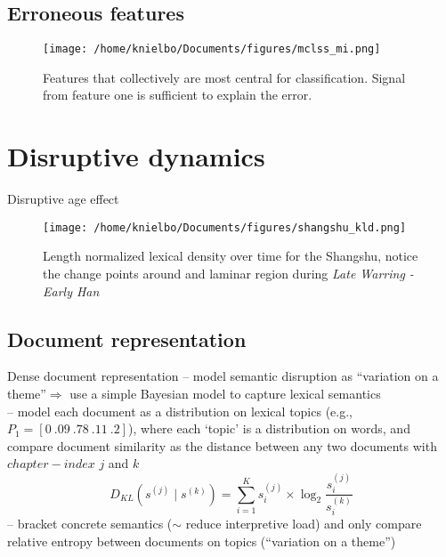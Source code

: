 \subsection{Erroneous features}
\begin{frame}
\begin{figure}
	\centering
	\texttt{[image: /home/knielbo/Documents/figures/mclss\_mi.png]}
	\caption{Features that collectively are most central for classification. Signal from feature one is sufficient to explain the error.}
\end{figure}
\end{frame}


\section{Disruptive dynamics}
\begin{frame}{Disruptive age effect}
\begin{figure}
	\centering
	\texttt{[image: /home/knielbo/Documents/figures/shangshu\_kld.png]}
	\caption{Length normalized lexical density over time for the Shangshu, notice the change points around and laminar region during \emph{Late Warring - Early Han}}
\end{figure}
\end{frame}


\subsection{Document representation}
\begin{frame}{Dense document representation}
-- model semantic disruption as ``variation on a theme''$\Rightarrow$ use a simple Bayesian model to capture lexical semantics\\
\smallskip
-- model each document as a distribution on lexical topics (e.g., {\small$P_1 = [0~.09~.78~.11~.2]$)}, where each `topic' is a distribution on words, and compare document similarity as the distance between any two documents with $chapter-index$ $j$ and $k$
\smallskip
\begin{equation*}
D_{KL} (s^{(j)} \mid s^{(k)}) = \sum_{i = 1}^{K} s_i^{(j)} \times \log_2 \frac{s_i^{(j)}}{s_i^{(k)}}
\end{equation*}
-- bracket concrete semantics ($\sim$ reduce interpretive load) and only compare relative entropy between documents on topics (``variation on a theme'')\\
\end{frame}


